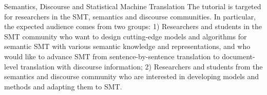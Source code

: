 \begin{tutorial}{Semantics, Discourse and Statistical Machine Translation}
The tutorial is targeted for researchers in the SMT, semantics and discourse communities. In particular, the expected audience comes from two groups: 1) Researchers and students in the SMT community who want to design cutting-edge models and algorithms for semantic SMT with various semantic knowledge and representations, and who would like to advance SMT from sentence-by-sentence translation to document-level translation with discourse information; 2) Researchers and students from the semantics and discourse community who are interested in developing models and methods and adapting them to SMT.

\end{tutorial}
